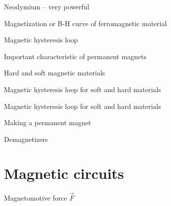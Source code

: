 \documentclass[compress]{beamer}
\begin{document}
{
    \begin{frame}{Neodymium -- very powerful}
    \end{frame}
}

{
    \begin{frame}{Magnetization or B-H curve of ferromagnetic material}
    \end{frame}
}

{
    \begin{frame}{Magnetic hysteresis loop}
    \end{frame}
}

{
    \begin{frame}{Important characteristic of permanent magnets}
    \end{frame}
}

{
    \begin{frame}{Hard and soft magnetic materials}
    \end{frame}
}

{
    \begin{frame}{Magnetic hysteresis loop for soft and hard materials}
    \end{frame}
}

{
    \begin{frame}{Magnetic hysteresis loop for soft and hard materials}
    \end{frame}
}

{
    \begin{frame}{Making a permanent magnet}
    \end{frame}
}


{
    \begin{frame}{Demagnetizers}
    \end{frame}
}

\section{Magnetic circuits}

{
    \begin{frame}{Magnetomotive force $\vec{F}$}
    \end{frame}
}
\end{document}
